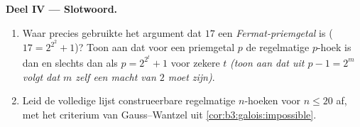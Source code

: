 \begin{problem}
\medskip
\noindent\textbf{Deel IV --- Slotwoord.}
\begin{enumerate}[resume]
  \item Waar precies gebruikte het argument dat $17$ een
        \emph{Fermat-priemgetal} is ($17 = 2^{2^2} + 1$)? Toon aan
        dat voor een priemgetal $p$ de regelmatige $p$-hoek
         is dan en slechts dan als $p = 2^{2^t} + 1$
        voor zekere $t$ \emph{(toon aan dat uit $p - 1 = 2^m$
        volgt dat $m$ zelf een macht van $2$ moet zijn)}.
  \item Leid de volledige lijst construeerbare regelmatige
        $n$-hoeken voor $n \leq 20$ af, met het criterium van
        Gauss--Wantzel uit \cref{cor:b3:galois:impossible}.
\end{enumerate}


\end{problem}
